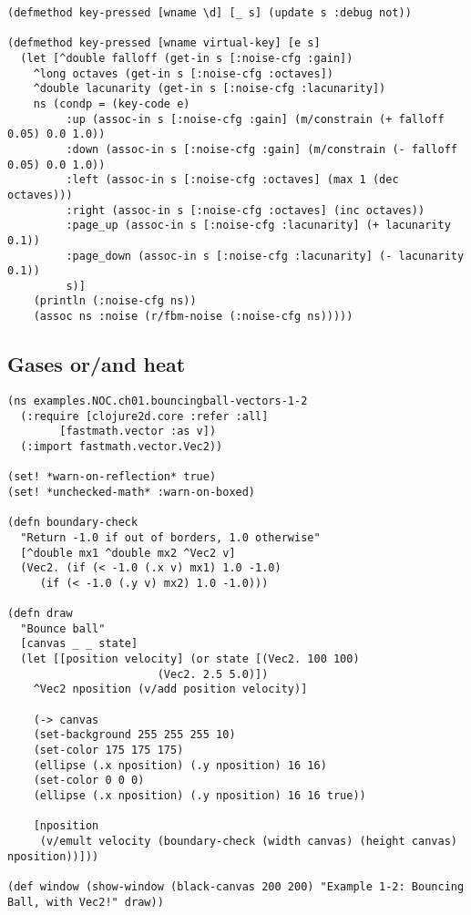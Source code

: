 \documentclass[11pt]{article}
\begin{document}
\begin{verbatim}
(defmethod key-pressed [wname \d] [_ s] (update s :debug not))

(defmethod key-pressed [wname virtual-key] [e s]
  (let [^double falloff (get-in s [:noise-cfg :gain])
	^long octaves (get-in s [:noise-cfg :octaves])
	^double lacunarity (get-in s [:noise-cfg :lacunarity])
	ns (condp = (key-code e)
	     :up (assoc-in s [:noise-cfg :gain] (m/constrain (+ falloff 0.05) 0.0 1.0))
	     :down (assoc-in s [:noise-cfg :gain] (m/constrain (- falloff 0.05) 0.0 1.0))
	     :left (assoc-in s [:noise-cfg :octaves] (max 1 (dec octaves)))
	     :right (assoc-in s [:noise-cfg :octaves] (inc octaves))
	     :page_up (assoc-in s [:noise-cfg :lacunarity] (+ lacunarity 0.1))
	     :page_down (assoc-in s [:noise-cfg :lacunarity] (- lacunarity 0.1))
	     s)]
    (println (:noise-cfg ns))
    (assoc ns :noise (r/fbm-noise (:noise-cfg ns)))))

\end{verbatim}

\subsection{Gases or/and heat}
\label{sec:orgdcc1fc0}
\begin{verbatim}
(ns examples.NOC.ch01.bouncingball-vectors-1-2
  (:require [clojure2d.core :refer :all]
	    [fastmath.vector :as v])
  (:import fastmath.vector.Vec2))

(set! *warn-on-reflection* true)
(set! *unchecked-math* :warn-on-boxed)

(defn boundary-check
  "Return -1.0 if out of borders, 1.0 otherwise"
  [^double mx1 ^double mx2 ^Vec2 v]
  (Vec2. (if (< -1.0 (.x v) mx1) 1.0 -1.0)
	 (if (< -1.0 (.y v) mx2) 1.0 -1.0)))

(defn draw
  "Bounce ball"
  [canvas _ _ state]
  (let [[position velocity] (or state [(Vec2. 100 100)
				       (Vec2. 2.5 5.0)])
	^Vec2 nposition (v/add position velocity)]

    (-> canvas
	(set-background 255 255 255 10)
	(set-color 175 175 175)
	(ellipse (.x nposition) (.y nposition) 16 16)
	(set-color 0 0 0)
	(ellipse (.x nposition) (.y nposition) 16 16 true))

    [nposition
     (v/emult velocity (boundary-check (width canvas) (height canvas) nposition))]))

(def window (show-window (black-canvas 200 200) "Example 1-2: Bouncing Ball, with Vec2!" draw))
\end{verbatim}
\end{document}
